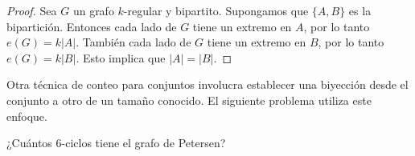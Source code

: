 \begin{proof}
    Sea $G$ un grafo $k$-regular y bipartito. Supongamos que $\{A, B\}$ es la bipartición. Entonces cada lado de $G$ tiene un extremo en $A$, por lo tanto $e(G) = k|A|$. También cada lado de $G$ tiene un extremo en $B$, por lo tanto $e(G) = k|B|$. Esto implica que $|A| = |B|$.
\end{proof}

\break

Otra técnica de conteo para conjuntos involucra establecer una biyección desde el conjunto a otro de un tamaño conocido. El siguiente problema utiliza este enfoque.

\begin{prob}
    ¿Cuántos $6$-ciclos tiene el grafo de Petersen?
\end{prob}

